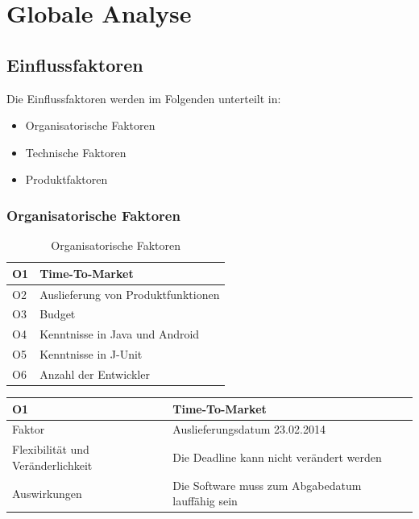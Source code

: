 \documentclass[fontsize=12pt,paper=a4,twoside]{scrartcl}
\begin{document}
\section{Globale Analyse}
\label{sec:globale_analyse}

\subsection{Einflussfaktoren}
\label{sec:einflussfaktoren}

Die Einflussfaktoren werden im Folgenden unterteilt in:

\begin{itemize}
\item{Organisatorische Faktoren}
\item{Technische Faktoren}
\item{Produktfaktoren}
\end{itemize}

\subsubsection{Organisatorische Faktoren}
\label{sec:orgfaktoren}

\begin{table}[H]
\centering
\caption{Organisatorische Faktoren}
\begin{tabular}{|l|l|} \hline
O1 & Time-To-Market \\ \hline
O2 & Auslieferung von Produktfunktionen \\ \hline
O3 & Budget \\ \hline
O4 & Kenntnisse in Java und Android \\ \hline
O5 & Kenntnisse in J-Unit \\ \hline
O6 & Anzahl der Entwickler\\ \hline
\end{tabular}
\end{table}

\begin{table}[H]
\begin{tabular}{|p{3cm}|p{12cm}|}\hline
O1 & Time-To-Market\\ \hline
Faktor & Auslieferungsdatum 23.02.2014\\ \hline
Flexibilität und Veränderlichkeit & Die Deadline kann nicht verändert werden\\ \hline
Auswirkungen & Die Software muss zum Abgabedatum lauffähig sein\\ \hline
\end{tabular}
\end{table}
\end{document}
